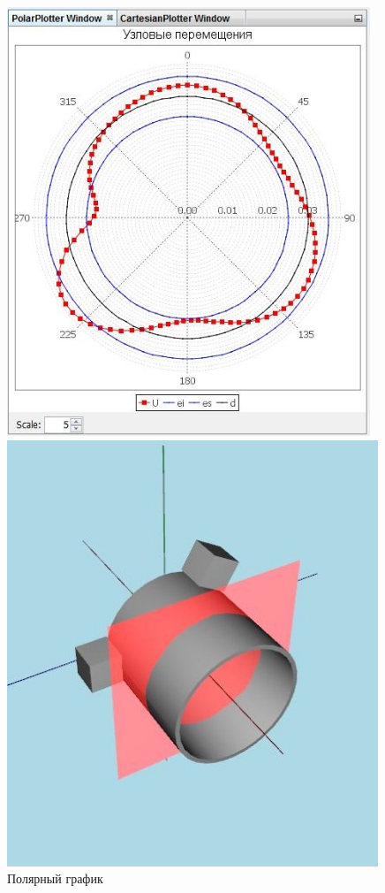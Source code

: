 \documentclass[14pt,oneside,final]{extreport}
\begin{document}
	
	\begin{figure}[t!]
		\centering	
		\noindent
		\begin{minipage}[b!]{0.5\textwidth}
			\includegraphics[width=0.97\textwidth]{img/graph-screen} 
			\caption{Полярный график}
			\label{fig:graph-screen}
		\end{minipage}%
		\begin{minipage}[b!]{0.5\textwidth}
			\includegraphics[width=0.99\textwidth]{img/viewport-screen2} 

\end{minipage}
\end{figure}
\end{document}
